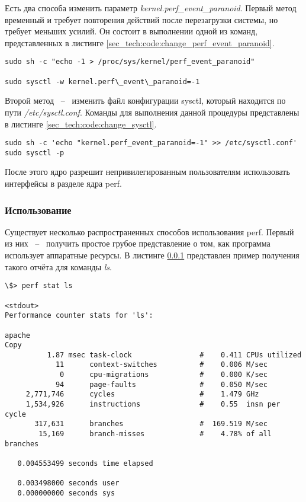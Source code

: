 Есть два способа изменить параметр \textit{kernel.perf\_event\_paranoid}.
Первый метод временный и требует повторения действий после перезагрузки системы, но требует меньших усилий.
Он состоит в выполнении одной из команд, представленных в листинге \ref{sec_tech:code:change_perf_event_paranoid}.

\begin{lstlisting}[style=CodeListing, label=sec_tech:code:change_perf_event_paranoid, caption={Способы изменения параметра}]
sudo sh -c "echo -1 > /proc/sys/kernel/perf_event_paranoid"

sudo sysctl -w kernel.perf\_event\_paranoid=-1
\end{lstlisting}

Второй метод ~--~ изменить файл конфигурации sysctl, который находится по пути \textit{/etc/sysctl.conf}.
Команды для выполнения данной процедуры представлены в листинге \ref{sec_tech:code:change_sysctl}.

\begin{lstlisting}[style=CodeListing, label=sec_tech:code:change_sysctl, caption={Правка файла конфигурации sysctl}]
sudo sh -c 'echo "kernel.perf_event_paranoid=-1" >> /etc/sysctl.conf'
sudo sysctl -p
\end{lstlisting}

После этого ядро разрешит непривилегированным пользователям использовать интерфейсы в разделе ядра perf.

\subsubsection{Использование} 

Существует несколько распространенных способов использования perf. 
Первый из них ~--~ получить простое грубое представление о том, как программа использует аппаратные ресурсы.
В листинге \ref{} представлен пример получения такого отчёта для команды \textit{ls}.

\begin{lstlisting}[style=CodeListing, label=sec_tech:code:pref_stat, caption={Пример использования команды perf stat}]
\$> perf stat ls

<stdout>
Performance counter stats for 'ls':

apache
Copy
          1.87 msec task-clock                #    0.411 CPUs utilized
            11      context-switches          #    0.006 M/sec
             0      cpu-migrations            #    0.000 K/sec
            94      page-faults               #    0.050 M/sec
     2,771,746      cycles                    #    1.479 GHz
     1,534,926      instructions              #    0.55  insn per cycle
       317,631      branches                  #  169.519 M/sec
        15,169      branch-misses             #    4.78% of all branches

   0.004553499 seconds time elapsed

   0.003498000 seconds user
   0.000000000 seconds sys
\end{lstlisting}


